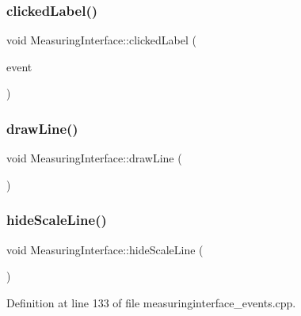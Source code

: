 \subsubsection{\texorpdfstring{clickedLabel()}{clickedLabel()}}
{\footnotesize\ttfamily void Measuring\+Interface\+::clicked\+Label (\begin{DoxyParamCaption}\item[{Q\+Mouse\+Event $\ast$}]{event }\end{DoxyParamCaption})\hspace{0.3cm}{\ttfamily [private]}}

\mbox{\label{class_measuring_interface_a0a8a206b6c86b0903943ae0646d09ff8}} 
\subsubsection{\texorpdfstring{drawLine()}{drawLine()}}
{\footnotesize\ttfamily void Measuring\+Interface\+::draw\+Line (\begin{DoxyParamCaption}{ }\end{DoxyParamCaption})\hspace{0.3cm}{\ttfamily [private]}}

\mbox{\label{class_measuring_interface_ad6344a968dacd55de9a7509698442d67}} 
\subsubsection{\texorpdfstring{hideScaleLine()}{hideScaleLine()}}
{\footnotesize\ttfamily void Measuring\+Interface\+::hide\+Scale\+Line (\begin{DoxyParamCaption}{ }\end{DoxyParamCaption})\hspace{0.3cm}{\ttfamily [private]}}



Definition at line 133 of file measuringinterface\+\_\+events.\+cpp.


